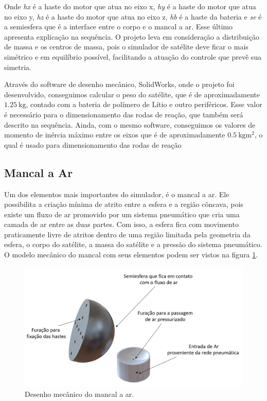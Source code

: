 Onde \textit{hx} é a haste do motor que atua no eixo x, \textit{hy} é a haste do motor que atua no eixo y, \textit{hz} é a haste do motor que atua no eixo z, \textit{hb} é a haste da bateria e \textit{se} é a semiesfera que é a interface entre o corpo e o mancal a ar. Esse último apresenta explicação na sequência. O projeto leva em consideração a distribuição de massa e os centros de massa, pois o simulador de satélite deve ficar o mais simétrico e em equilíbrio possível, facilitando a atuação do controle que prevê sua simetria.

Através do software de desenho mecânico, SolidWorks, onde o projeto foi desenvolvido, conseguimos calcular o peso do satélite, que é de aproximadamente $\SI{1.25}{\kg}$, contado com a bateria de polímero de Lítio e outro periféricos. Esse valor é necessário para o dimensionamento das rodas de reação, que também será descrito na sequência. Ainda, com o mesmo software, conseguimos os valores de momento de inércia máximo entre os eixos que é de aproximadamente $\SI{0.5}{\kg\meter\squared}$, o qual é usado para dimensionamento das rodas de reação



\subsection{Mancal a Ar}

Um dos elementos mais importantes do simulador, é o mancal a ar. Ele possibilita a criação mínima de atrito entre a esfera e a região côncava, pois existe um fluxo de ar promovido por um sistema pneumático que cria uma camada de ar entre as duas partes. Com isso, a esfera fica com movimento praticamente livre de atritos dentro de uma região limitada pela geometria da esfera, o corpo do satélite, a massa do satélite e a pressão do sistema pneumático. O modelo mecânico do mancal com seus elementos podem ser vistos na figura \ref{fig:base_desenho}.

\begin{figure}[H]
  \caption{Desenho mecânico do mancal a ar.}
  \begin{center}
      \includegraphics[scale=.45]{metodologia/img/base_desenho}
  \end{center}
  \label{fig:base_desenho}
\end{figure}

